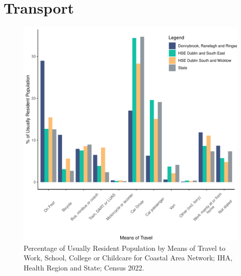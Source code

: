 \documentclass{article}
\begin{document}
\section{Transport}\label{sect:Trans}
\begin{figure}[H]
	\centering
	\includegraphics[width = 120mm]{../figures/TravelED.pdf}
	\caption{Percentage of Usually Resident Population by Means of Travel to Work, School, College or Childcare for Coastal Area Network; IHA, Health Region and State; Census 2022.}
	\label{fig:vbnv}
	\end{figure}
\end{document}
